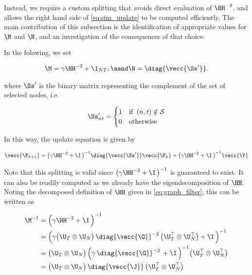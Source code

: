 Instead, we require a custom splitting that avoids direct evaluation of $\HH^{-2}$, and allows the right hand side of \cref{eq:sim_update} to be computed efficiently. The main contribution of this subsection is the identification of appropriate values for $\M$ and $\N$, and an investigation of the consequences of that choice. 

In the folowing, we set 

\begin{equation}
    \M = \gamma \HH^{-2} + \I_{NT}, \aand \N = \diag{\vecc{\Ss'}}.
\end{equation}

where $\Ss'$ is the binary matrix representing the complement of the set of selected nodes, i.e.

\begin{equation}
    \label{eq:S_}
    \Ss'_{nt} = \begin{cases}
        1 & \text{if} \;\; (n, t) \notin \mathcal{S} \\
        0 & \text{otherwise}
    \end{cases}
\end{equation}

In this way, the update equation is given by 

\begin{equation}
    \label{eq:sim_update2}
    \vecc{\F_{k+1}} = \big(\gamma \HH^{-2} + \I \, \big)^{-1}  \diag{\vecc{\Ss'}} \vecc{\F_{k}} + \big(\gamma \HH^{-2} + \I \, \big)^{-1} \vecc{\Y}
\end{equation}



Note that this splitting is valid since $\big(\gamma\HH^{-2} + \I \, \big)^{-1}$ is guaranteed to exist. It can also be readily computed as we already have the eigendecomposition of $\HH$. Noting the decomposed definition of $\HH$ given in \cref{eq:graph_filter}, this can be written as

\begin{align}
    \label{eq:M_inv}
    \M^{-1} & = \Big( \gamma \HH^{-2} + \I \, \Big)^{-1} \notag \\
            & = \Big( \gamma \big(\U_T \otimes \U_N\big)\, \diag{\vecc{\G}}^{-2}\,  \big(\U_T^\top \otimes \U_N^\top\big)  + \I \, \Big)^{-1} \notag   \\
            & = \big(\U_T \otimes \U_N\big)\, \Big( \gamma \, \diag{\vecc{\G}}^{-2}\,    + \I \, \Big)^{-1} \big(\U_T^\top \otimes \U_N^\top\big) \notag \\
            & = \big(\U_T \otimes \U_N\big)\, \diag{\vecc{\J}}\,  \big(\U_T^\top \otimes \U_N^\top\big)
\end{align}

